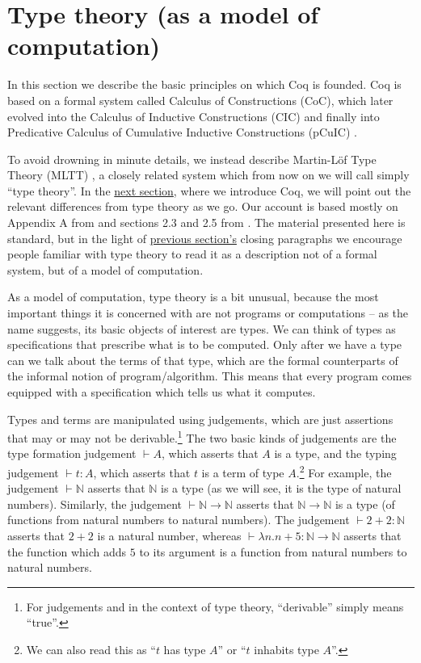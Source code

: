 \documentclass[declaration,mgr,english,shortabstract]{iithesis}
\newcommand{\type}[2]{#1 \vdash #2}
\newcommand{\term}[3]{#1 \vdash #2 : #3}
\newcommand{\N}{\mathbb{N}}
\begin{document}
\section{Type theory (as a model of computation)} \label{mltt}

In this section we describe the basic principles on which Coq is founded. Coq is based on a formal system called Calculus of Constructions (CoC)\cite{CoC}, which later evolved into the Calculus of Inductive Constructions (CIC) \cite{CIC} and finally into Predicative Calculus of Cumulative Inductive Constructions (pCuIC) \cite{pCuIC}.

To avoid drowning in minute details, we instead describe Martin-L\"{o}f Type Theory (MLTT) \cite{MLTT1} \cite{MLTT2} \cite{Hofmann}, a closely related system which from now on we will call simply ``type theory''. In the \hyperref[coq]{next section}, where we introduce Coq, we will point out the relevant differences from type theory as we go. Our account is based mostly on Appendix A from \cite{HoTTBook} and sections 2.3 and 2.5 from \cite{Overlapping}. The material presented here is standard, but in the light of \hyperref[formal]{previous section's} closing paragraphs we encourage people familiar with type theory to read it as a description not of a formal system, but of a model of computation.

As a model of computation, type theory is a bit unusual, because the most important things it is concerned with are not programs or computations -- as the name suggests, its basic objects of interest are types. We can think of types as specifications that prescribe what is to be computed. Only after we have a type can we talk about the terms of that type, which are the formal counterparts of the informal notion of program/algorithm. This means that every program comes equipped with a specification which tells us what it computes.

Types and terms are manipulated using judgements, which are just assertions that may or may not be derivable.\footnote{For judgements and in the context of type theory, ``derivable'' simply means ``true''.} The two basic kinds of judgements are the type formation judgement $\type{}{A}$, which asserts that $A$ is a type, and the typing judgement $\term{}{t}{A}$, which asserts that $t$ is a term of type $A$.\footnote{We can also read this as ``$t$ has type $A$'' or ``$t$ inhabits type $A$''.} For example, the judgement $\type{}{\N}$ asserts that $\N$ is a type (as we will see, it is the type of natural numbers). Similarly, the judgement $\type{}{\N \to \N}$ asserts that $\N \to \N$ is a type (of functions from natural numbers to natural numbers). The judgement $\term{}{2 + 2}{\N}$ asserts that $2 + 2$ is a natural number, whereas $\term{}{\lambda n. n + 5}{\N \to \N$} asserts that the function which adds $5$ to its argument is a function from natural numbers to natural numbers.
\end{document}

